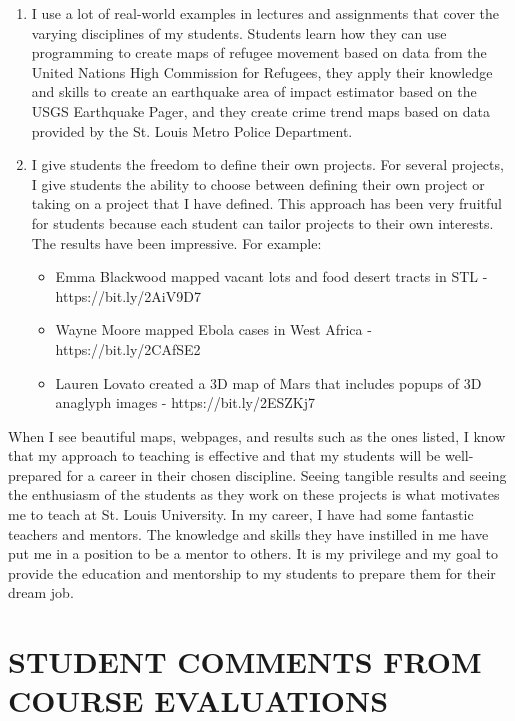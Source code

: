 \documentclass{res}
\begin{document}
\begin{resume}
\begin{enumerate}
\item I use a lot of real-world examples in lectures and assignments that cover the varying disciplines of my students. Students learn how they can use programming to create maps of refugee movement based on data from the United Nations High Commission for Refugees, they apply their knowledge and skills to create an earthquake area of impact estimator based on the USGS Earthquake Pager, and they create crime trend maps based on data provided by the St. Louis Metro Police Department.
\item I give students the freedom to define their own projects. For several projects, I give students the ability to choose between defining their own project or taking on a project that I have defined. This approach has been very fruitful for students because each student can tailor projects to their own interests. The results have been impressive. For example:
\begin{itemize}  
\item Emma Blackwood mapped vacant lots and food desert tracts in STL - 
https://bit.ly/2AiV9D7 
\item Wayne Moore mapped Ebola cases in West Africa - https://bit.ly/2CAfSE2 
\item Lauren Lovato created a 3D map of Mars that includes popups of 3D anaglyph images - https://bit.ly/2ESZKj7
\end{itemize}
\end{enumerate}
\par When I see beautiful maps, webpages, and results such as the ones listed, I know that my approach to teaching is effective and that my students will be well-prepared for a career in their chosen discipline. Seeing tangible results and seeing the enthusiasm of the students as they work on these projects is what motivates me to teach at St. Louis University. In my career, I have had some fantastic teachers and mentors. The knowledge and skills they have instilled in me have put me in a position to be a mentor to others. It is my privilege and my goal to provide the education and mentorship to my students to prepare them for their dream job.
 
 
\section{STUDENT COMMENTS FROM COURSE EVALUATIONS}
   \vspace{-0.1in}	


\end{resume}
\end{document}
